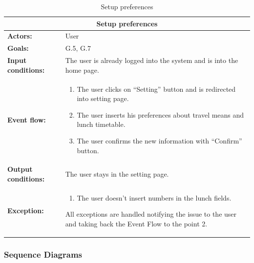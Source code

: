 \begin{table}
\begin{tabular} { p{5cm} p{8cm} }
\multicolumn{2}{c}{\textbf{Setup preferences}} \\
\hline
\textbf{Actors:} & User \\ 
\textbf{Goals:} & G.5, G.7 \\ 
\textbf{Input conditions:} & The user is already logged into the system and is into the home page. \\
\textbf{Event flow:} & \begin{enumerate}
				\item
				The user clicks on “Setting” button and is redirected into setting page.
				\item
				The user inserts his preferences about travel means and lunch timetable.
				\item
				The user confirms the new information with “Confirm” button.
			\end{enumerate}\\ 
\textbf{Output conditions:} & The user stays in the setting page.\\ 
\textbf{Exception:} & \begin{enumerate}
				\item
				The user doesn’t insert numbers in the lunch fields.
			\end{enumerate}
All exceptions are handled notifying the issue to the user and taking back the Event Flow to the point 2. \\
\hline
\end{tabular}
\caption{Setup preferences}
\label{ref:setuppreferences}
\end{table}
\clearpage

\subsubsection{Sequence Diagrams}

